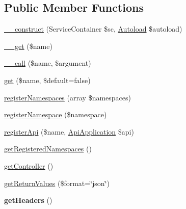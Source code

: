 \subsection*{Public Member Functions}
\begin{DoxyCompactItemize}
\item 
\hyperlink{class_utopia_1_1_components_1_1_http_1_1_api_application_a340e2fe39427e16d9b82e6e0c0cce2b8}{\_\-\_\-construct} (ServiceContainer \$sc, \hyperlink{class_utopia_1_1_components_1_1_autoloader_1_1_autoload}{Autoload} \$autoload)
\item 
\hyperlink{class_utopia_1_1_components_1_1_http_1_1_api_application_abc8e9e31bb15c8a44c3210ec551407c8}{\_\-\_\-get} (\$name)
\item 
\hyperlink{class_utopia_1_1_components_1_1_http_1_1_api_application_a0eb52356889d21276080a9b7ceabf51f}{\_\-\_\-call} (\$name, \$argument)
\item 
\hyperlink{class_utopia_1_1_components_1_1_http_1_1_api_application_a8c34073e5e433931085430ecdf461065}{get} (\$name, \$default=false)
\item 
\hyperlink{class_utopia_1_1_components_1_1_http_1_1_api_application_afd147d473364c7df6b9b327bae802b82}{registerNamespaces} (array \$namespaces)
\item 
\hyperlink{class_utopia_1_1_components_1_1_http_1_1_api_application_aa518e2c8933dbf9ca5f424c27c03715e}{registerNamespace} (\$namespace)
\item 
\hyperlink{class_utopia_1_1_components_1_1_http_1_1_api_application_aae81fb635da71d7e0d698e4f7868c6ef}{registerApi} (\$name, \hyperlink{class_utopia_1_1_components_1_1_http_1_1_api_application}{ApiApplication} \$api)
\item 
\hyperlink{class_utopia_1_1_components_1_1_http_1_1_api_application_abbbcbfa8d80937eae9db2f1cad1b89dd}{getRegisteredNamespaces} ()
\item 
\hyperlink{class_utopia_1_1_components_1_1_http_1_1_api_application_aa8b89e0bad51878addc1300cd3e95b5c}{getController} ()
\item 
\hyperlink{class_utopia_1_1_components_1_1_http_1_1_api_application_ace0beea73e7d3c49c15ba49732966127}{getReturnValues} (\$format=\char`\"{}json\char`\"{})
\item 
\hypertarget{class_utopia_1_1_components_1_1_http_1_1_api_application_a157e0005d82edaa21cbea07fdc5c62da}{
{\bfseries getHeaders} ()}
\label{class_utopia_1_1_components_1_1_http_1_1_api_application_a157e0005d82edaa21cbea07fdc5c62da}


\end{DoxyCompactItemize}
